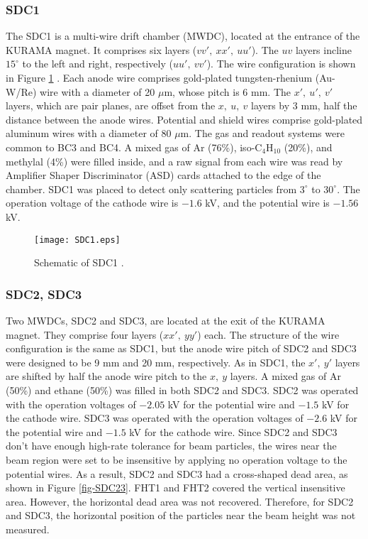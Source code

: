 %
\subsubsection{SDC1}
The SDC1 is a multi-wire drift chamber (MWDC), located at the entrance of the KURAMA magnet. It comprises six layers ($vv',\ xx',\ uu'$). The $uv$ layers incline $15^{\circ}$ to the left and right, respectively ($uu',\ vv'$). The wire configuration is shown in Figure \ref{fig-SDC1} \cite{Nana-D}. Each anode wire comprises gold-plated tungsten-rhenium (Au-W/Re) wire with a diameter of 20 $\mu$m, whose pitch is 6 mm. The $x',\ u',\ v'$ layers, which are pair planes, are offset from the $x,\ u,\ v$ layers by 3 mm, half the distance between the anode wires. Potential and shield wires comprise gold-plated aluminum wires with a diameter of 80 $\mu$m. 
The gas and readout systems were common to BC3 and BC4. A mixed gas of Ar (76\%), iso-C$_4$H$_{10}$ (20\%), and methylal (4\%) were filled inside, and a raw signal from each wire was read by Amplifier Shaper Discriminator (ASD) cards attached to the edge of the chamber. SDC1 was placed to detect only scattering particles from $3^{\circ}$ to $30^{\circ}$.
The operation voltage of the cathode wire is $-1.6$ kV, and the potential wire is $-1.56$ kV.

\begin{figure}[!h]
 \begin{center}
   \texttt{[image: SDC1.eps]}
   \caption{Schematic of SDC1 \cite{Nana-D}.}
   \label{fig-SDC1}
 \end{center}
\end{figure}

%
\subsubsection{SDC2, SDC3}
\label{sec: SDC23}
Two MWDCs, SDC2 and SDC3, are located at the exit of the KURAMA magnet. They comprise four layers ($xx',\ yy'$) each. The structure of the wire configuration is the same as SDC1, but the anode wire pitch of SDC2 and SDC3 were designed to be 9 mm and 20 mm, respectively. As in SDC1, the $x',\ y'$ layers are shifted by half the anode wire pitch to the $x,\ y$ layers. A mixed gas of Ar (50\%) and ethane (50\%) was filled in both SDC2 and SDC3. SDC2 was operated with the operation voltages of $-2.05$ kV for the potential wire and $-1.5$ kV for the cathode wire. SDC3 was operated with the operation voltages of $-2.6$ kV for the potential wire and $-1.5$ kV for the cathode wire. Since SDC2 and SDC3 don't have enough high-rate tolerance for beam particles, the wires near the beam region were set to be insensitive by applying no operation voltage to the potential wires. As a result, SDC2 and SDC3 had a cross-shaped dead area, as shown in Figure \ref{fig-SDC23}. FHT1 and FHT2 covered the vertical insensitive area. However, the horizontal dead area was not recovered. Therefore, for SDC2 and SDC3, the horizontal position of the particles near the beam height was not measured. %

